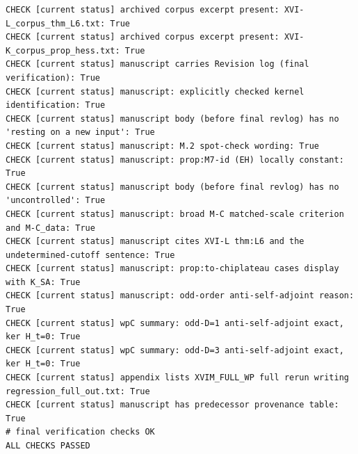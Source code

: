 \documentclass{article}
\theoremstyle{remark}
\begin{document}
\begin{lstlisting}
CHECK [current status] archived corpus excerpt present: XVI-L_corpus_thm_L6.txt: True
CHECK [current status] archived corpus excerpt present: XVI-K_corpus_prop_hess.txt: True
CHECK [current status] manuscript carries Revision log (final verification): True
CHECK [current status] manuscript: explicitly checked kernel identification: True
CHECK [current status] manuscript body (before final revlog) has no 'resting on a new input': True
CHECK [current status] manuscript: M.2 spot-check wording: True
CHECK [current status] manuscript: prop:M7-id (EH) locally constant: True
CHECK [current status] manuscript body (before final revlog) has no 'uncontrolled': True
CHECK [current status] manuscript: broad M-C matched-scale criterion and M-C_data: True
CHECK [current status] manuscript cites XVI-L thm:L6 and the undetermined-cutoff sentence: True
CHECK [current status] manuscript: prop:to-chiplateau cases display with K_SA: True
CHECK [current status] manuscript: odd-order anti-self-adjoint reason: True
CHECK [current status] wpC summary: odd-D=1 anti-self-adjoint exact, ker H_t=0: True
CHECK [current status] wpC summary: odd-D=3 anti-self-adjoint exact, ker H_t=0: True
CHECK [current status] appendix lists XVIM_FULL_WP full rerun writing regression_full_out.txt: True
CHECK [current status] manuscript has predecessor provenance table: True
# final verification checks OK
ALL CHECKS PASSED
\end{lstlisting}
\end{document}
